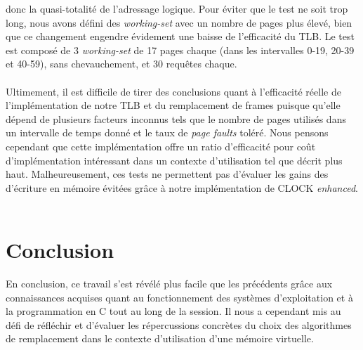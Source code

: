 \documentclass{article}
\begin{document}
donc la quasi-totalité de l’adressage logique. Pour éviter que le test ne soit trop long, nous avons défini des \emph{working-set} avec un 
nombre de pages plus élevé, bien que ce changement engendre évidement une baisse de l’efficacité du TLB. Le test est composé de 3 
\emph{working-set} de 17 pages chaque (dans les intervalles 0-19, 20-39 et 40-59), sans chevauchement, et 30 requêtes chaque. \\
\\
Ultimement, il est difficile de tirer des conclusions quant à l’efficacité réelle de l’implémentation de notre TLB et du remplacement de frames 
puisque qu’elle dépend de plusieurs facteurs inconnus tels que le nombre de pages utilisés dans un intervalle de temps donné et le taux de 
\emph{page faults} toléré. Nous pensons cependant que cette implémentation offre un ratio d’efficacité pour coût d’implémentation intéressant 
dans un contexte d’utilisation tel que décrit plus haut. Malheureusement, ces tests ne permettent pas d’évaluer les gains des d’écriture en 
mémoire évitées grâce à notre implémentation de CLOCK \emph{enhanced}.\\
\\
\section{Conclusion}
\setlength{\parindent}{20pt}
En conclusion, ce travail s’est révélé plus facile que les précédents grâce aux connaissances acquises quant au fonctionnement des systèmes 
d’exploitation et à la programmation en C tout au long de la session. Il nous a cependant mis au défi de réfléchir et d’évaluer les  
répercussions concrètes du choix des algorithmes de remplacement dans le contexte d’utilisation d’une mémoire virtuelle.\\
\end{document}
